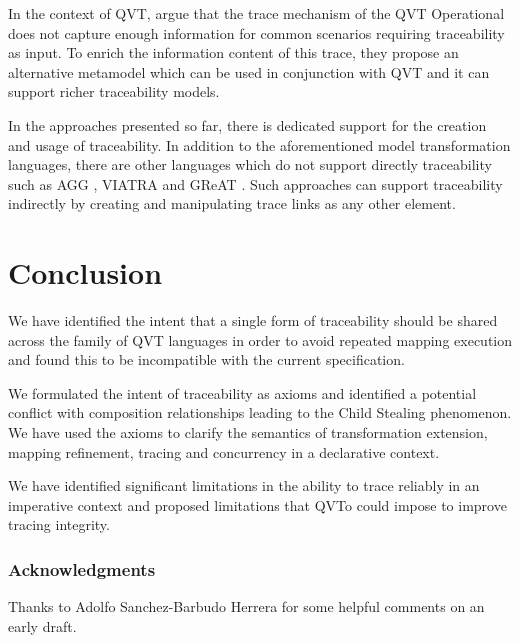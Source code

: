 \documentclass[runningheads,a4paper]{llncs}
\begin{document}
In the context of QVT, \cite{aranega2011using}  argue that the trace mechanism
of the QVT Operational does not capture enough information for common scenarios
requiring traceability as input. To enrich the information content of this
trace, they propose an alternative metamodel which can be used in conjunction
with QVT and it can support richer traceability models.

In the approaches presented so far, there is dedicated support for the creation
and usage of traceability. In addition to the aforementioned model
transformation languages, there are other languages which do not support
directly traceability such as AGG \cite{taentzer2004agg}, VIATRA
\cite{varro2003viatra} and GReAT \cite{agrawal2003graph}. Such approaches can
support traceability indirectly by creating and manipulating trace links as any
other element.

\section{Conclusion}\label{conclude}

We have identified the intent that a single form of traceability should be shared across the family of QVT languages in order to avoid repeated mapping execution and found this to be incompatible with the current specification.

We formulated the intent of traceability as axioms and identified a potential conflict with composition relationships leading to the Child Stealing phenomenon. We have used the axioms to clarify the semantics of transformation extension, mapping refinement, tracing and concurrency in a declarative context.

We have identified significant limitations in the ability to trace reliably in an imperative context and proposed limitations that QVTo could impose to improve tracing integrity.

\subsubsection{Acknowledgments}

Thanks to Adolfo Sanchez-Barbudo Herrera for some helpful comments on an early draft.



\end{document}
